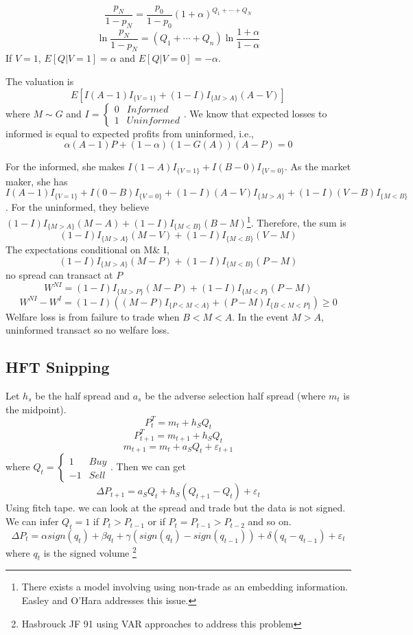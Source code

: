 \documentclass[11pt, a4paper, oneside]{article}
\theoremstyle{definition}
\theoremstyle{proposition}
\theoremstyle{corollary}
\theoremstyle{lemma}
\theoremstyle{theorem}
\begin{document}
$$\frac{p_N}{1 - p_N} = \frac{p_0}{1- p_0}(1+ \alpha)^{Q_1+\cdots + Q_N}$$
$$\ln \frac{p_N}{1- p_N} = (Q_1+\cdots+Q_n)\ln\frac{1 + \alpha}{1-\alpha}$$
If $V=1$, $E[Q|V=1] = \alpha$ and $E[Q|V= 0] = -\alpha$. 

The valuation is
$$ E\left[I(A -1)I_{\{V = 1\}} + (1 - I)I_{\{M > A\}} (A - V)\right]$$
where $M \sim G$ and $I = \begin{cases} 0 & Informed \\  1 & Uninformed \end{cases}$. 
We know that expected losses to informed is equal to expected profits from uninformed, i.e., 
$$\alpha(A - 1) P + (1- \alpha)(1- G(A))(A - P) = 0$$

For the informed, she makes $I(1-A)I_{\{V= 1\}} + I(B - 0)I_{\{V = 0\}}$. As the market maker, she has $I(A-  1)I_{\{V = 1\}} + I(0 - B)I_{\{V = 0\}} + (1- I)(A-V)I_{\{M > A\}} + (1- I)(V- B) I_{\{M < B\}}$. For the uninformed, they believe $(1- I)I_{\{M > A\}} (M - A) + (1- I)I_{\{M < B\}}(B - M)$\footnote{There exists a model involving using non-trade as an embedding information. Easley and O'Hara addresses this issue.}. Therefore, the sum is 
$$(1- I)I_{\{M > A\}}(M - V) + (1- I)I_{\{M < B\}}(V - M)$$
The expectations conditional on M\& I,
$$(1- I)I_{\{M> A\}}(M - P) + (1 - I)I_{\{M < B\}} (P - M)$$
no spread can transact at $P$ 
$$W^{NI} = (1- I) I_{\{M > P\}}(M - P) + (1- I) I_{\{M < P\}}(P - M)$$ 
$$W^{NI} - W^I = (1- I)\left((M-P)I_{\{P < M < A\}} + (P - M)I_{\{B < M < P\}}\right) \geq 0$$
Welfare loss is from failure to trade when $B < M < A$. In the event $M > A$, uninformed transact so no welfare loss. 

\subsection{HFT Snipping}

Let $h_s$ be the half spread and $a_s$ be the adverse selection half spread (where $m_t$ is the midpoint). 
$$P_t^T = m_t + h_S Q_t$$
$$P_{t+1}^T = m_{t+1} + h_S Q_t$$
$$m_{t+1} = m_t + a_S Q_t + \varepsilon_{t+1}$$
where $Q_t = \begin{cases}
1 & Buy \\
-1 & Sell 
\end{cases}$.
Then we can get
$$\Delta P_{t+1} = a_S Q_t + h_S (Q_{t+1} - Q_t) + \varepsilon_t$$
Using fitch tape. we can look at the spread and trade but the data is not signed. We can infer $Q_t = 1$ if $P_t > P_{t-1}$ or if $P_t = P_{t-1} > P_{t -2}$ and so on. 
$$\Delta P_t = \alpha sign(q_t) + \beta q_t + \gamma (sign(q_t) - sign(q_{t-1})) + \delta (q_t - q_{t-1}) + \varepsilon_t$$
where $q_t$ is the signed volume \footnote{Hasbrouck JF 91 using VAR approaches to address this problem} 
\end{document}
